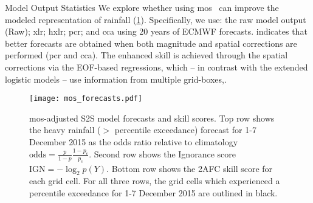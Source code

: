 \begin{block}{Model Output Statistics}
    We explore whether using \gls{mos}~\cite{Glahn:1972iw} can improve the modeled representation of rainfall (\cref{fig:subs-prob-fcst}).
    Specifically, we use: the raw model output (Raw); \gls{xlr}; \gls{hxlr}; \gls{pcr}; and \gls{cca} using 20 years of ECMWF forecasts.
     indicates that better forecasts are obtained when both magnitude and spatial corrections are performed (\gls{pcr} and \gls{cca}).
    The enhanced skill is achieved through the spatial corrections via the EOF-based regressions, which – in contrast with the extended logistic models – use information from multiple grid-boxes,.
    \begin{framed}
        \begin{figure}
            \noindent\texttt{[image: mos\_forecasts.pdf]}
            \caption{
                \Gls{mos}-adjusted S2S model forecasts and skill scores.
                Top row shows the heavy rainfall ($>$ percentile exceedance) forecast for 1-7 December 2015 as the odds ratio relative to climatology $\text{odds} = \frac{p}{1-p}\frac{1-p_c}{p_c}$.
                Second row shows the Ignorance score $\text{IGN}=-\log_2 p(Y)$.
                Bottom row shows the 2AFC skill score for each grid cell.
                For all three rows, the grid cells which experienced a  percentile exceedance for 1-7 December 2015 are outlined in black.
            }\label{fig:subs-prob-fcst}
        \end{figure}
    \end{framed}
\end{block}
